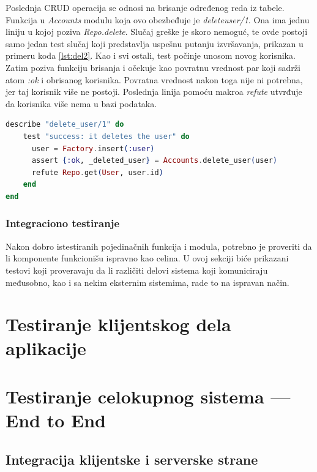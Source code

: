 \documentclass[12pt,oneside]{memoir}
\begin{document}
\par Poslednja CRUD operacija se odnosi na brisanje određenog reda iz tabele. Funkcija u \emph{Accounts} modulu koja ovo obezbeđuje je \emph{delete{\textunderscore}user/1}. Ona ima jednu liniju u kojoj poziva \emph{Repo.delete}. Slučaj greške je skoro nemoguć, te ovde postoji samo jedan test slučaj koji predstavlja uspešnu putanju izvršavanja, prikazan u primeru koda \ref{lst:del2}. Kao i svi ostali, test počinje unosom novog korisnika. Zatim poziva funkciju brisanja i očekuje kao povratnu vrednost par koji sadrži atom \emph{:ok} i obrisanog korisnika. Povratna vrednost nakon toga nije ni potrebna, jer taj korisnik više ne postoji. Poslednja linija pomoću makroa \emph{refute} utvrđuje da korisnika više nema u bazi podataka. 

\begin{lstlisting}[language=elixir, caption={Testiranje funkcije \emph{delete{\textunderscore}user/1}},captionpos=b, label={lst:del2}]
describe "delete_user/1" do
    test "success: it deletes the user" do
      user = Factory.insert(:user)
      assert {:ok, _deleted_user} = Accounts.delete_user(user)
      refute Repo.get(User, user.id)
    end
end
\end{lstlisting}

\subsection{Integraciono testiranje}

\par Nakon dobro istestiranih pojedinačnih funkcija i modula, potrebno je proveriti da li komponente funkcionišu ispravno kao celina. U ovoj sekciji biće prikazani testovi koji proveravaju da li različiti delovi sistema koji komuniciraju međusobno, kao i sa nekim eksternim sistemima, rade to na ispravan način.


\chapter{Testiranje klijentskog dela aplikacije}
\label{chp:elm}

\chapter{Testiranje celokupnog sistema --- End to End}
\label{chp:e2e}

\section{Integracija klijentske i serverske strane}
\end{document}
